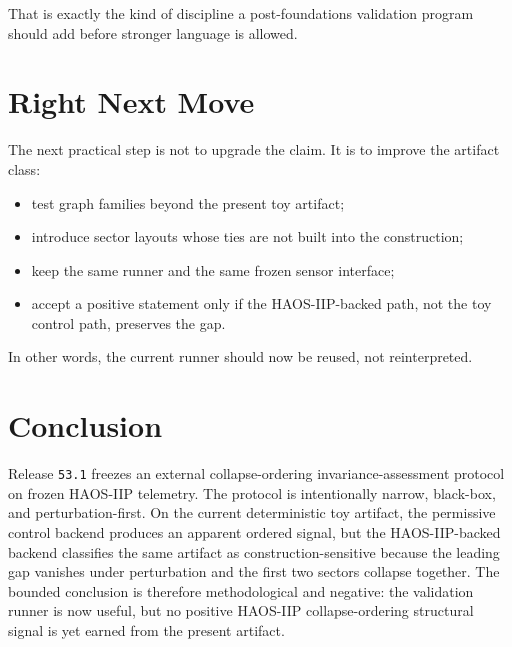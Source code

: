 \documentclass[11pt]{article}
\begin{document}
That is exactly the kind of discipline a post-foundations validation program should add before stronger language is allowed.

\section{Right Next Move}

The next practical step is not to upgrade the claim. It is to improve the artifact class:
\begin{itemize}
\item test graph families beyond the present toy artifact;
\item introduce sector layouts whose ties are not built into the construction;
\item keep the same runner and the same frozen sensor interface;
\item accept a positive statement only if the HAOS-IIP-backed path, not the toy control path, preserves the gap.
\end{itemize}

In other words, the current runner should now be reused, not reinterpreted.

\section{Conclusion}

Release \texttt{53.1} freezes an external collapse-ordering invariance-assessment protocol on frozen HAOS-IIP telemetry. The protocol is intentionally narrow, black-box, and perturbation-first. On the current deterministic toy artifact, the permissive control backend produces an apparent ordered signal, but the HAOS-IIP-backed backend classifies the same artifact as construction-sensitive because the leading gap vanishes under perturbation and the first two sectors collapse together. The bounded conclusion is therefore methodological and negative: the validation runner is now useful, but no positive HAOS-IIP collapse-ordering structural signal is yet earned from the present artifact.
\end{document}
